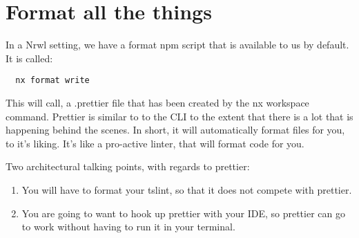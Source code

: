 \maketitle{}
\section{ Format all the things }

In a Nrwl setting, we have a format npm script that is available to us by default.
It is called:

\begin{verbatim}
  nx format write
\end{verbatim}

This will call, a .prettier file that has been created by the nx workspace
command. Prettier is similar to to the CLI to the extent that there is a lot
that is happening behind the scenes. In short, it will automatically format files
for you, to it's liking. It's like a pro-active linter, that will format code
for you.

Two architectural talking points, with regards to prettier:
\begin{enumerate}
  \item You will have to format your tslint, so that it does not compete with prettier.
  \item You are going to want to hook up prettier with your IDE, so prettier
  can go to work without having to run it in your terminal.
\end{enumerate}
